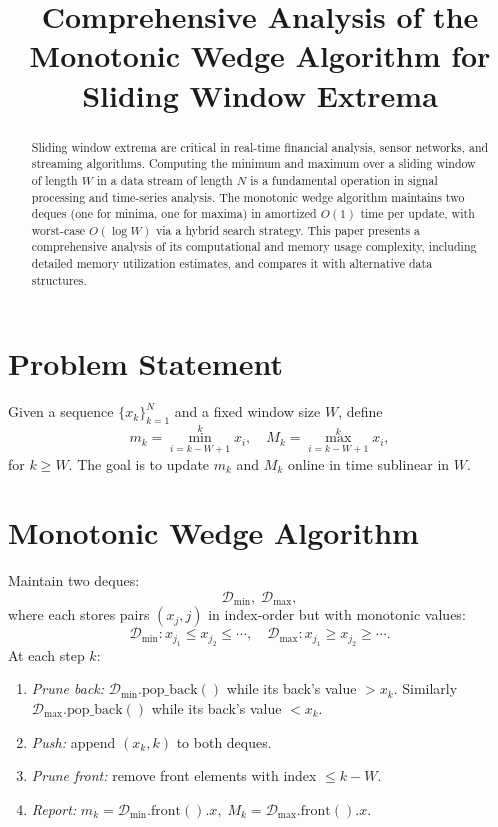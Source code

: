 \documentclass[12pt,letterpaper]{article}
\title{Comprehensive Analysis of the Monotonic Wedge Algorithm for Sliding Window Extrema}
\date{}
\begin{document}
\maketitle

\begin{abstract}
Sliding window extrema are critical in real-time financial analysis, sensor networks, and streaming algorithms. Computing the minimum and maximum over a sliding window of length \(W\) in a data stream of length \(N\) is a fundamental operation in signal processing and time-series analysis.  The monotonic wedge algorithm maintains two deques (one for minima, one for maxima) in amortized \(O(1)\) time per update, with worst-case \(O(\log W)\) via a hybrid search strategy.  This paper presents a comprehensive analysis of its computational and memory usage complexity, including detailed memory utilization estimates, and compares it with alternative data structures.
\end{abstract}

\section{Problem Statement}
Given a sequence \(\{x_k\}_{k=1}^N\) and a fixed window size \(W\), define
\[
m_k = \min_{i=k-W+1}^k x_i,
\quad
M_k = \max_{i=k-W+1}^k x_i,
\]
for \(k\ge W\).  The goal is to update \(m_k\) and \(M_k\) online in time sublinear in \(W\).

\section{Monotonic Wedge Algorithm}
Maintain two deques:
\[
\mathcal{D}_{\min},\;\mathcal{D}_{\max},
\]
where each stores pairs \((x_j,j)\) in index‐order but with monotonic values:
\[
\mathcal{D}_{\min}: x_{j_1}\le x_{j_2}\le\cdots,
\quad
\mathcal{D}_{\max}: x_{j_1}\ge x_{j_2}\ge\cdots.
\]
At each step \(k\):
\begin{enumerate}
  \item \emph{Prune back:}
    \(\mathcal{D}_{\min}.\mathrm{pop\_back}()\) while its back’s value \(>x_k\).
    Similarly \(\mathcal{D}_{\max}.\mathrm{pop\_back}()\) while its back’s value \(<x_k\).
  \item \emph{Push:} append \((x_k,k)\) to both deques.
  \item \emph{Prune front:} remove front elements with index \(\le k-W\).
  \item \emph{Report:}  
    \(m_k=\mathcal{D}_{\min}.\mathrm{front}().x,\;M_k=\mathcal{D}_{\max}.\mathrm{front}().x.\)
\end{enumerate}
\end{document}
